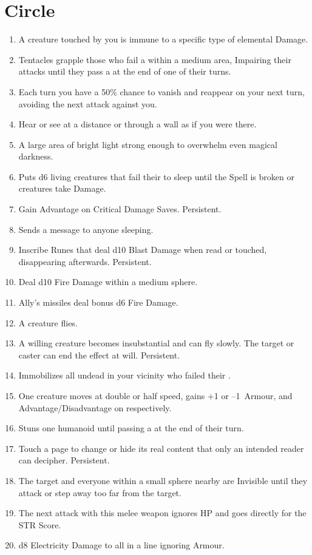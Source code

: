 \documentclass[itdr/core]{subfiles}
\begin{document}
\section{ Circle}
\def \spellcircle {3}
\begin{enumerate}
	\item {} A creature touched by you is immune to a specific type of elemental Damage.
	\item {} Tentacles grapple those who fail a  within a medium area, Impairing their attacks until they pass a  at the end of one of their turns.
	\item {} Each turn you have a 50\% chance to vanish and reappear on your next turn, avoiding the next attack against you.
	\item {} Hear or see at a distance or through a wall as if you were there.
	\item {} A large area of bright light strong enough to overwhelm even magical darkness.
	\item {} Puts d6 living creatures that fail their  to sleep until the Spell is broken or creatures take Damage.
	\item {} Gain Advantage on Critical Damage Saves. Persistent.
	\item {} Sends a message to anyone sleeping.
	\item {} Inscribe Runes that deal d10 Blast Damage when read or touched, disappearing afterwards. Persistent.
	\item {} Deal d10 Fire Damage within a medium sphere.
	\item {} Ally's missiles deal bonus d6 Fire Damage.
	\item {} A creature flies.
	\item {} A willing creature becomes \mbox{insubstantial} and can fly slowly. The target or caster can end the effect at will. Persistent.
	\item {} Immobilizes all undead in your vicinity who failed their .
	\item {} One creature moves at double or half speed, gains +1 or --1~Armour, and Advantage/Disadvantage on  respectively.
	\item {} Stuns one humanoid until passing a  at the end of their turn.
	\item {} Touch a page to change or hide its real content that only an intended reader can decipher. Persistent.
	\item {} The target and everyone within a small sphere nearby are Invisible until they attack or step away too far from the target.
	\item {} The next attack with this melee weapon ignores HP and goes directly for the STR Score.
	\item {} d8 Electricity Damage to all in a line ignoring Armour.


\end{enumerate}
\end{document}
